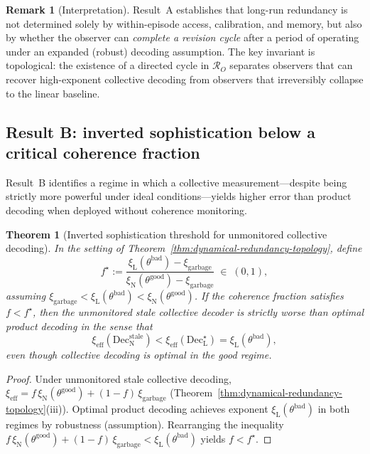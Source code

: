 \documentclass[11pt]{article}
\newcommand{\cR}{\mathcal{R}}
\newcommand{\1}{\mathbf{1}}
\newcommand{\QCBdist}{\xi}
\theoremstyle{definition}
\newtheorem{remark}{Remark}
\theoremstyle{plain}
\newtheorem{theorem}{Theorem}
\begin{document}
\begin{remark}[Interpretation]
Result~A establishes that long-run redundancy is not determined solely by within-episode access, calibration, and memory, but also by whether the observer can \emph{complete a revision cycle} after a period of operating under an expanded (robust) decoding assumption.
The key invariant is topological: the existence of a directed cycle in $\cR_O$ separates observers that can recover high-exponent collective decoding from observers that irreversibly collapse to the linear baseline.
\end{remark}

\subsection{Result B: inverted sophistication below a critical coherence fraction}

Result~B identifies a regime in which a collective measurement---despite being strictly more powerful under ideal conditions---yields higher error than product decoding when deployed without coherence monitoring.

\begin{theorem}[Inverted sophistication threshold for unmonitored collective decoding]
\label{thm:inverted-sophistication}
In the setting of Theorem~\ref{thm:dynamical-redundancy-topology}, define
\[
f^\star
:=
\frac{\QCBdist_{\mathrm{L}}(\theta^{\mathrm{bad}})-\QCBdist_{\mathrm{garbage}}}{\QCBdist_{\mathrm{N}}(\theta^{\mathrm{good}})-\QCBdist_{\mathrm{garbage}}}
\;\in\;(0,1),
\]
assuming $\QCBdist_{\mathrm{garbage}}<\QCBdist_{\mathrm{L}}(\theta^{\mathrm{bad}})<\QCBdist_{\mathrm{N}}(\theta^{\mathrm{good}})$.
If the coherence fraction satisfies $f<f^\star$, then the unmonitored stale collective decoder is strictly worse than optimal product decoding in the sense that
\[
\QCBdist_{\mathrm{eff}}(\mathrm{Dec}_{\mathrm{N}}^{\mathrm{stale}})
<
\QCBdist_{\mathrm{eff}}(\mathrm{Dec}_{\mathrm{L}}^{\star})
=
\QCBdist_{\mathrm{L}}(\theta^{\mathrm{bad}}),
\]
even though collective decoding is optimal in the good regime.
\end{theorem}

\begin{proof}
Under unmonitored stale collective decoding,
$\QCBdist_{\mathrm{eff}}=f\,\QCBdist_{\mathrm{N}}(\theta^{\mathrm{good}})+(1-f)\,\QCBdist_{\mathrm{garbage}}$ (Theorem~\ref{thm:dynamical-redundancy-topology}(iii)).
Optimal product decoding achieves exponent $\QCBdist_{\mathrm{L}}(\theta^{\mathrm{bad}})$ in both regimes by robustness (assumption).
Rearranging the inequality
$f\,\QCBdist_{\mathrm{N}}(\theta^{\mathrm{good}})+(1-f)\,\QCBdist_{\mathrm{garbage}} < \QCBdist_{\mathrm{L}}(\theta^{\mathrm{bad}})$
yields $f<f^\star$.
\end{proof}
\end{document}

